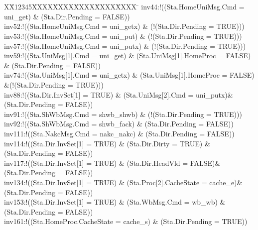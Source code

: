 \documentclass{llncs-new}
\newlength{\fminilength}
\newenvironment{fmini}[1][\linewidth]
  {\setlength{\fminilength}{#1\fboxsep-2\fboxrule}%
   \vspace{2ex}\noindent\begin{lrbox}{\fminibox}\begin{minipage}{\fminilength}%
   \mbox{ }\hfill\vspace{-2.5ex}}%
  {\end{minipage}\end{lrbox}\vspace{1ex}\hspace{0ex}%
   \framebox{\usebox{\fminibox}}}
\newenvironment{specification}
{\noindent\scriptsize
\tt\begin{fmini}\begin{tabbing}X\=X12345\=XXXX\=XXXX\=XXXX\=XXXX\=XXXX
\=\+\kill} {\end{tabbing}\normalfont\end{fmini}}
\begin{document}
\begin{specification}
inv44:!((Sta.HomeUniMsg.Cmd = uni\_get) \& (Sta.Dir.Pending = FALSE))\\
inv52:!((Sta.HomeUniMsg.Cmd = uni\_getx) \& (!(Sta.Dir.Pending = TRUE)))\\
inv53:!((Sta.HomeUniMsg.Cmd = uni\_put) \& (!(Sta.Dir.Pending = TRUE)))\\
inv57:!((Sta.HomeUniMsg.Cmd = uni\_putx) \& (!(Sta.Dir.Pending = TRUE)))\\
inv59:!((Sta.UniMsg[1].Cmd = uni\_get) \& (Sta.UniMsg[1].HomeProc = FALSE) \& (Sta.Dir.Pending = FALSE))\\
inv74:!((Sta.UniMsg[1].Cmd = uni\_getx) \& (Sta.UniMsg[1].HomeProc = FALSE) \&(!(Sta.Dir.Pending = TRUE)))\\
inv88:!((Sta.Dir.InvSet[1] = TRUE)  \& (Sta.UniMsg[2].Cmd = uni\_putx)\& (Sta.Dir.Pending = FALSE))\\
inv91:!((Sta.ShWbMsg.Cmd = shwb\_shwb) \& (!(Sta.Dir.Pending = TRUE)))\\
inv92:!((Sta.ShWbMsg.Cmd = shwb\_fack) \& (Sta.Dir.Pending = FALSE))\\
inv111:!((Sta.NakcMsg.Cmd = nakc\_nakc) \& (Sta.Dir.Pending = FALSE))\\
inv114:!((Sta.Dir.InvSet[1] = TRUE) \& (Sta.Dir.Dirty = TRUE) \& (Sta.Dir.Pending = FALSE))\\
inv117:!((Sta.Dir.InvSet[1] = TRUE)  \& (Sta.Dir.HeadVld = FALSE)\& (Sta.Dir.Pending = FALSE))\\
inv134:!((Sta.Dir.InvSet[1] = TRUE)  \& (Sta.Proc[2].CacheState = cache\_e)\& (Sta.Dir.Pending = FALSE))\\
inv153:!((Sta.Dir.InvSet[1] = TRUE) \& (Sta.WbMsg.Cmd = wb\_wb) \& (Sta.Dir.Pending = FALSE))\\
inv161:!((Sta.HomeProc.CacheState = cache\_s) \& (Sta.Dir.Pending = TRUE))
\end{specification}
\end{document}
